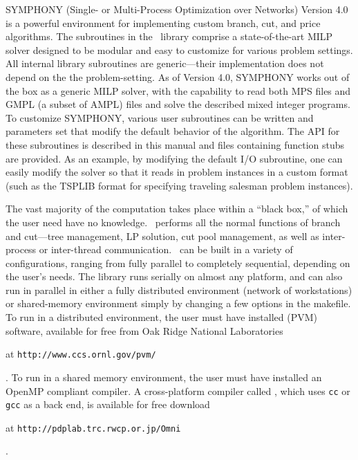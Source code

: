 SYMPHONY (Single- or Multi-Process Optimization over Networks) Version 4.0 is
a powerful environment for implementing custom branch, cut, and price
algorithms. The subroutines in the \BB\ library comprise a state-of-the-art
MILP solver designed to be modular and easy to customize for various problem
settings. All internal library subroutines are generic---their implementation
does not depend on the the problem-setting. As of Version 4.0, SYMPHONY works
out of the box as a generic MILP solver, with the capability to read both MPS
files and GMPL (a subset of AMPL) files and solve the described mixed integer
programs. To customize SYMPHONY, various user subroutines can be written and
parameters set that modify the default behavior of the algorithm. The API for
these subroutines is described in this manual and files containing function
stubs are provided. As an example, by modifying the default I/O subroutine,
one can easily modify the solver so that it reads in problem instances in a
custom format (such as the TSPLIB format for specifying traveling salesman
problem instances).

The vast majority of the computation takes place within a ``black box,'' of
which the user need have no knowledge. \BB\ performs all the normal functions
of branch and cut---tree management, LP solution, cut pool management, as well
as inter-process or inter-thread communication. \BB\ can be built in a variety
of configurations, ranging from fully parallel to completely sequential,
depending on the user's needs. The library runs serially on almost any
platform, and can also run in parallel in either a fully distributed
environment (network of workstations) or shared-memory environment simply by
changing a few options in the makefile. To run in a distributed environment,
the user must have installed {\em
{}}
(PVM) software, available for free from Oak Ridge National Laboratories
\begin{latexonly}
at {\tt http://www.ccs.ornl.gov/pvm/} 
\end{latexonly}. 
To run in a shared memory environment, the user must have installed an
OpenMP compliant compiler. A cross-platform compiler called {\em
{}}, which uses 
{\tt cc} or {\tt gcc} as a back end, is available for free download
\begin{latexonly}
at {\tt http://pdplab.trc.rwcp.or.jp/Omni}
\end{latexonly}.

